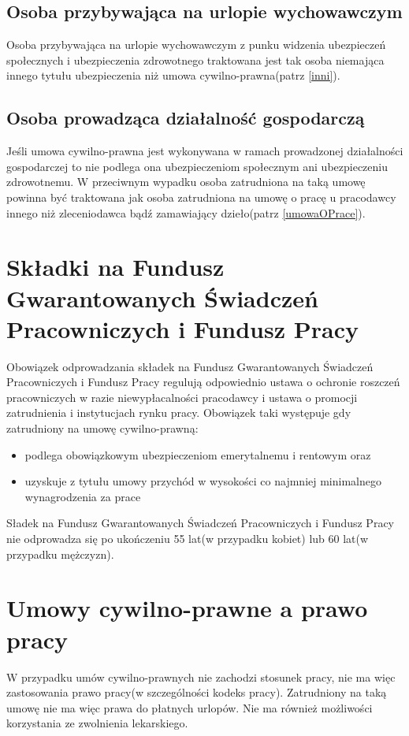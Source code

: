 \subsection[Osoba przybywająca na urlopie wychowawczym][Osoba przybywająca na urlopie wychowawczym]{Osoba przybywająca na urlopie wychowawczym}
Osoba przybywająca na urlopie wychowawczym z punku widzenia ubezpieczeń społecznych i ubezpieczenia zdrowotnego traktowana jest tak osoba niemająca innego tytułu ubezpieczenia niż umowa cywilno-prawna(patrz \ref{inni}).

\subsection[Osoba prowadząca działalność gospodarczą][Osoba prowadząca działalność gospodarczą]{Osoba prowadząca działalność gospodarczą}
Jeśli umowa cywilno-prawna jest wykonywana w ramach prowadzonej działalności gospodarczej to nie podlega ona ubezpieczeniom społecznym ani ubezpieczeniu zdrowotnemu. W przeciwnym wypadku osoba zatrudniona na taką umowę powinna być traktowana jak osoba zatrudniona na umowę o pracę u pracodawcy innego niż zleceniodawca bądź zamawiający dzieło(patrz \ref{umowaOPrace}).

\section{Składki na Fundusz Gwarantowanych Świadczeń Pracowniczych i Fundusz Pracy}
Obowiązek odprowadzania składek na Fundusz Gwarantowanych Świadczeń Pracowniczych i Fundusz Pracy regulują odpowiednio ustawa o ochronie roszczeń pracowniczych w razie niewypłacalności pracodawcy\cite{TODO} i ustawa o promocji zatrudnienia i instytucjach rynku pracy. Obowiązek taki występuje gdy zatrudniony na umowę cywilno-prawną:
\begin{itemize}
	\item podlega obowiązkowym ubezpieczeniom emerytalnemu i rentowym oraz
	\item uzyskuje z tytułu umowy przychód w wysokości co najmniej minimalnego wynagrodzenia za prace
\end{itemize}
Sładek na Fundusz Gwarantowanych Świadczeń Pracowniczych i Fundusz Pracy nie odprowadza się po ukończeniu 55 lat(w przypadku kobiet) lub 60 lat(w przypadku mężczyzn).

\section[Umowy cywilno-prawne a prawo pracy][Umowy cywilno-prawne a prawo pracy]{Umowy cywilno-prawne a prawo pracy}
W przypadku umów cywilno-prawnych nie zachodzi stosunek pracy, nie ma więc zastosowania prawo pracy(w szczególności kodeks pracy). Zatrudniony na taką umowę nie ma więc prawa do płatnych urlopów. Nie ma również możliwości korzystania ze zwolnienia lekarskiego.

